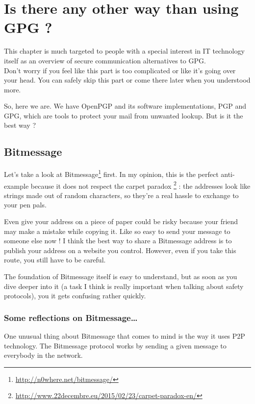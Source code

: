 \chapter{Is there any other way than using GPG ?}

\begin{notice}
	This chapter is much targeted to people with a special
	interest in IT technology itself as an overview of secure communication
	alternatives to GPG.\\Don't worry if you feel like this part is too
	complicated or like it's going over your head. You can safely skip this
	part or come there later when you understood more.
\end{notice}

So, here we are. We have OpenPGP and its software implementations, PGP
and GPG, which are tools to protect your mail from unwanted lookup. But
is it the best way ?

\section{Bitmessage}\label{bitmessage}

Let's take a look at Bitmessage\footnote{\url{http://n0where.net/bitmessage/}}
first. In my opinion, this is the perfect anti-example because it does
not respect the carpet paradox
\footnote{\url{http://www.22decembre.eu/2015/02/23/carpet-paradox-en/}} : the addresses look like strings made out of random
characters, so they're a real hassle to exchange to your pen pals.

Even give your address on a piece of paper could be risky because your
friend may make a mistake while copying it. Like so easy to send your
message to someone else now ! I think the best way to share a
Bitmessage address is to publish your address on a website you
control. However, even if you take this route, you still have to be
careful.

The foundation of Bitmessage itself is easy to understand, but as soon
as you dive deeper into it (a task I think is really important when
talking about safety protocols), you it gets confusing rather quickly.

\subsection{Some reflections on Bitmessage\ldots{}}\label{some-reflections-on-bitmessage}

One unusual thing about Bitmessage that comes to mind is the way it uses P2P technology. The Bitmessage protocol works by sending a given message
to everybody in the network.

